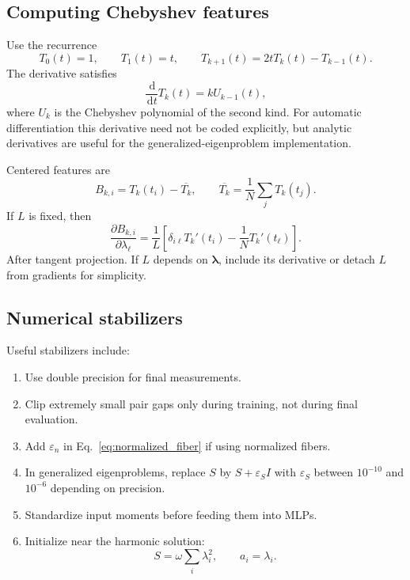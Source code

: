\documentclass[11pt]{article}
\newcommand{\dd}{\,\mathrm d}
\newcommand{\eps}{\varepsilon}
\begin{document}
\subsection{Computing Chebyshev features}

Use the recurrence
\begin{equation}
T_0(t)=1,
\qquad
T_1(t)=t,
\qquad
T_{k+1}(t)=2tT_k(t)-T_{k-1}(t).
\end{equation}
The derivative satisfies
\begin{equation}
\frac{\dd}{\dd t}T_k(t)=kU_{k-1}(t),
\end{equation}
where $U_k$ is the Chebyshev polynomial of the second kind.  For automatic differentiation this derivative need not be coded explicitly, but analytic derivatives are useful for the generalized-eigenproblem implementation.

Centered features are
\begin{equation}
B_{k,i}=T_k(t_i)-\overline{T_k},
\qquad
\overline{T_k}=\frac1N\sum_jT_k(t_j).
\end{equation}
If $L$ is fixed, then
\begin{equation}
\frac{\partial B_{k,i}}{\partial\lambda_\ell}
=\frac1L\left[\delta_{i\ell}T_k'(t_i)-\frac1NT_k'(t_\ell)\right].
\end{equation}
After tangent projection.  If $L$ depends on $\bm\lambda$, include its derivative or detach $L$ from gradients for simplicity.

\subsection{Numerical stabilizers}

Useful stabilizers include:
\begin{enumerate}[label=(\alph*)]
\item Use double precision for final measurements.
\item Clip extremely small pair gaps only during training, not during final evaluation.
\item Add $\eps_n$ in Eq.~\eqref{eq:normalized_fiber} if using normalized fibers.
\item In generalized eigenproblems, replace $S$ by $S+\eps_S I$ with $\eps_S$ between $10^{-10}$ and $10^{-6}$ depending on precision.
\item Standardize input moments before feeding them into MLPs.
\item Initialize near the harmonic solution:
\begin{equation}
S=\omega\sum_i\lambda_i^2,
\qquad
 a_i=\lambda_i.
\end{equation}
\end{enumerate}
\end{document}
